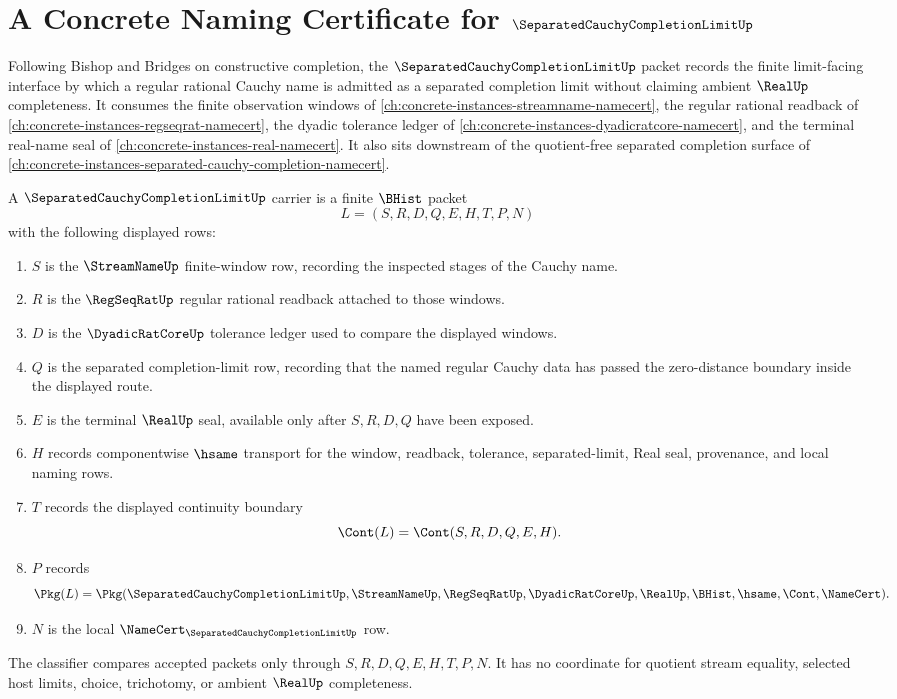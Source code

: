 \chapter{A Concrete Naming Certificate for $\SeparatedCauchyCompletionLimitUp$}
\label{ch:concrete-instances-separated-cauchy-completion-limit-namecert}

Following Bishop and Bridges on constructive completion, the $\SeparatedCauchyCompletionLimitUp$ packet records the finite limit-facing interface by which a regular rational Cauchy name is admitted as a separated completion limit without claiming ambient $\RealUp$ completeness. It consumes the finite observation windows of \autoref{ch:concrete-instances-streamname-namecert}, the regular rational readback of \autoref{ch:concrete-instances-regseqrat-namecert}, the dyadic tolerance ledger of \autoref{ch:concrete-instances-dyadicratcore-namecert}, and the terminal real-name seal of \autoref{ch:concrete-instances-real-namecert}. It also sits downstream of the quotient-free separated completion surface of \autoref{ch:concrete-instances-separated-cauchy-completion-namecert}.

\begin{definition}
\label{def:separated-cauchy-completion-limit-carrier}
A $\SeparatedCauchyCompletionLimitUp$ carrier is a finite $\BHist$ packet
$$
L=(S,R,D,Q,E,H,T,P,N)
$$
with the following displayed rows:
\begin{enumerate}
\item $S$ is the $\StreamNameUp$ finite-window row, recording the inspected stages of the Cauchy name.
\item $R$ is the $\RegSeqRatUp$ regular rational readback attached to those windows.
\item $D$ is the $\DyadicRatCoreUp$ tolerance ledger used to compare the displayed windows.
\item $Q$ is the separated completion-limit row, recording that the named regular Cauchy data has passed the zero-distance boundary inside the displayed route.
\item $E$ is the terminal $\RealUp$ seal, available only after $S,R,D,Q$ have been exposed.
\item $H$ records componentwise $\hsame$ transport for the window, readback, tolerance, separated-limit, Real seal, provenance, and local naming rows.
\item $T$ records the displayed continuity boundary
$$
\Cont(L)=\Cont(S,R,D,Q,E,H).
$$
\item $P$ records
$$
\Pkg(L)=\Pkg(\SeparatedCauchyCompletionLimitUp,\StreamNameUp,\RegSeqRatUp,\DyadicRatCoreUp,\RealUp,\BHist,\hsame,\Cont,\NameCert).
$$
\item $N$ is the local $\NameCert_{\SeparatedCauchyCompletionLimitUp}$ row.
\end{enumerate}
The classifier compares accepted packets only through $S,R,D,Q,E,H,T,P,N$. It has no coordinate for quotient stream equality, selected host limits, choice, trichotomy, or ambient $\RealUp$ completeness.
\end{definition}

